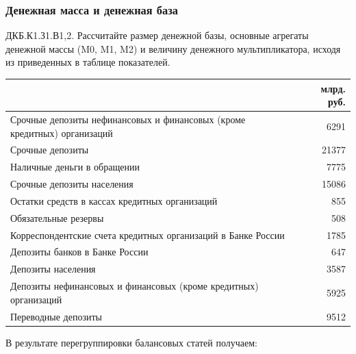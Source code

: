 \documentclass[12pt, table, a4paper,twoside]{exam}
\begin{document}
\begin{questions}
\subsubsection{Денежная масса и денежная база}
\question[10] ДКБ.К1.З1.В1,2. Рассчитайте размер денежной базы, основные агрегаты денежной массы (M0, M1, M2) и величину денежного мультипликатора, исходя из приведенных в таблице показателей.
\begin{table}[h]
	\begin{tabularx}{\linewidth}[b]{@{}>{\raggedright\arraybackslash}Xr@{}}		& млрд. руб.\\
		\toprule
		Срочные депозиты нефинансовых и финансовых (кроме кредитных) организаций & 6291 \\
		Срочные депозиты & 21377 \\
		Наличные деньги в обращении & 7775 \\
		Срочные депозиты населения & 15086 \\
		Остатки средств в кассах кредитных организаций & 855 \\
		Обязательные резервы & 508 \\
		Корреспондентские счета кредитных организаций в Банке России & 1785 \\
		Депозиты банков в Банке России & 647 \\
		Депозиты населения & 3587 \\
		Депозиты нефинансовых и финансовых (кроме кредитных) организаций & 5925 \\
		Переводные депозиты & 9512 \\
		\bottomrule
	\end{tabularx}%
\end{table}
\begin{solution}[12em] В результате перегруппировки балансовых статей получаем:
	

\end{solution}
\end{questions}
\end{document}
